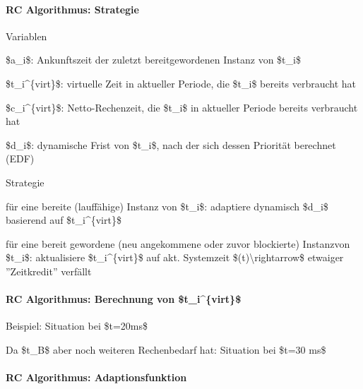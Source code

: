 \documentclass[a4paper]{article}
\begin{document}
\begin{multicols}{3}
    \paragraph{RC Algorithmus: Strategie}

    \begin{itemize*}
        \item
        Variablen
        \begin{itemize*}
            \item \$a\_i\$: Ankunftszeit der zuletzt bereitgewordenen Instanz von \$t\_i\$
            \item \$t\_i\^{}\{virt\}\$: virtuelle Zeit in aktueller Periode, die \$t\_i\$ bereits verbraucht hat
            \item \$c\_i\^{}\{virt\}\$: Netto-Rechenzeit, die \$t\_i\$ in aktueller Periode bereits verbraucht hat
            \item \$d\_i\$: dynamische Frist von \$t\_i\$, nach der sich dessen Priorität berechnet (EDF)
        \end{itemize*}
        \item
        Strategie
        \begin{itemize*}
            \item für eine bereite (lauffähige) Instanz von \$t\_i\$: adaptiere dynamisch \$d\_i\$ basierend auf \$t\_i\^{}\{virt\}\$
            \item für eine bereit gewordene (neu angekommene oder zuvor blockierte) Instanzvon \$t\_i\$: aktualisiere \$t\_i\^{}\{virt\}\$ auf akt. Systemzeit \$(t)\textbackslash rightarrow\$ etwaiger ''Zeitkredit'' verfällt
        \end{itemize*}
    \end{itemize*}


    \paragraph{RC Algorithmus: Berechnung von
    \$t\_i\^{}\{virt\}\$}

    Beispiel: Situation bei \$t=20ms\$

    Da \$t\_B\$ aber noch weiteren Rechenbedarf hat: Situation bei \$t=30
    ms\$


    \paragraph{RC Algorithmus:
        Adaptionsfunktion}


\end{multicols}
\end{document}
